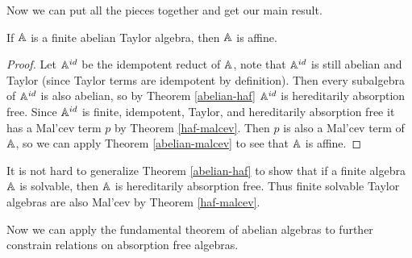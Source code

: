 \documentclass[letterpaper,11pt]{article}
\begin{document}
Now we can put all the pieces together and get our main result.

\begin{thm}\label{taylor-abelian} If $\mathbb{A}$ is a finite abelian Taylor algebra, then $\mathbb{A}$ is affine.
\end{thm}
\begin{proof} Let $\mathbb{A}^{id}$ be the idempotent reduct of $\mathbb{A}$, note that $\mathbb{A}^{id}$ is still abelian and Taylor (since Taylor terms are idempotent by definition). Then every subalgebra of $\mathbb{A}^{id}$ is also abelian, so by Theorem \ref{abelian-haf} $\mathbb{A}^{id}$ is hereditarily absorption free. Since $\mathbb{A}^{id}$ is finite, idempotent, Taylor, and hereditarily absorption free it has a Mal'cev term $p$ by Theorem \ref{haf-malcev}. Then $p$ is also a Mal'cev term of $\mathbb{A}$, so we can apply Theorem \ref{abelian-malcev} to see that $\mathbb{A}$ is affine.
\end{proof}

\begin{rem} It is not hard to generalize Theorem \ref{abelian-haf} to show that if a finite algebra $\mathbb{A}$ is solvable, then $\mathbb{A}$ is hereditarily absorption free. Thus finite solvable Taylor algebras are also Mal'cev by Theorem \ref{haf-malcev}.
\end{rem}

Now we can apply the fundamental theorem of abelian algebras to further constrain relations on absorption free algebras.
\end{document}
